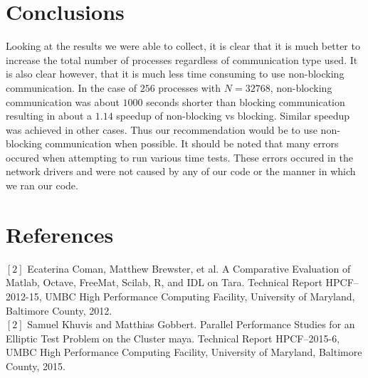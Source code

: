 \documentclass[11pt]{article}
\begin{document}
\section{Conclusions}
Looking at the results we were able to collect, it is clear that it is much better to increase the total number of processes regardless of communication type used. It is also clear however, that it is much less time consuming to use non-blocking communication. In the case of $256$ processes with $N=32768$, non-blocking communication was about $1000$ seconds shorter than blocking communication resulting in about a $1.14$ speedup of non-blocking vs blocking. Similar speedup was achieved in other cases. Thus our recommendation would be to use non-blocking communication when possible. It should be noted that many errors occured when attempting to run various time tests. These errors occured in the network drivers and were not caused by any of our code or the manner in which we ran our code.
\section*{References}

$\left[2\right]$  Ecaterina Coman, Matthew Brewster, et al. A Comparative Evaluation of Matlab, Octave, FreeMat, Scilab, R, and IDL on Tara. Technical Report HPCF–2012-15, UMBC High Performance Computing Facility, University of Maryland, Baltimore County, 2012.\\
$\left[2\right]$  Samuel Khuvis and Matthias Gobbert. Parallel Performance Studies for an Elliptic Test Problem on the Cluster maya. Technical Report HPCF–2015-6, UMBC High Performance Computing Facility, University of Maryland, Baltimore County, 2015.
\end{document}
